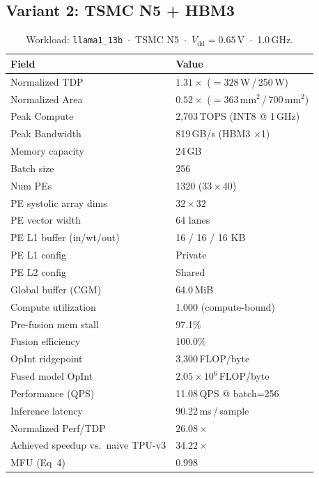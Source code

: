 \subsection{Variant 2: TSMC N5 + HBM3}
\label{app:n5}
\begin{table}[h]
\centering
\caption{Workload: \texttt{llama1\_13b}~$\cdot$~TSMC N5~$\cdot$~$V_\text{dd}=0.65$\,V~$\cdot$~1.0\,GHz.}
\label{tab:cheetah_v2_llama1_13b}
\small\setlength{\tabcolsep}{6pt}
\begin{tabular}{@{}ll@{}}
\toprule
\textbf{Field} & \textbf{Value} \\
\midrule
Normalized TDP          & $1.31\times$ ($= 328$\,W\,/\,250\,W) \\
Normalized Area         & $0.52\times$ ($= 363$\,mm$^2$\,/\,700\,mm$^2$) \\
Peak Compute            & 2{,}703\,TOPS (INT8 @ 1\,GHz) \\
Peak Bandwidth          & 819\,GB/s (HBM3 $\times$1) \\
Memory capacity         & 24\,GB \\
Batch size              & 256 \\
Num PEs                 & 1320 ($33 \times 40$) \\
PE systolic array dims  & $32 \times 32$ \\
PE vector width         & 64 lanes \\
PE L1 buffer (in/wt/out) & 16 / 16 / 16 KB \\
PE L1 config            & Private \\
PE L2 config            & Shared \\
Global buffer (CGM)     & 64.0\,MiB \\
\midrule
Compute utilization     & 1.000 (compute-bound) \\
Pre-fusion mem stall    & 97.1\% \\
Fusion efficiency       & 100.0\% \\
OpInt ridgepoint        & 3{,}300\,FLOP/byte \\
Fused model OpInt       & $2.05 \times 10^{6}$\,FLOP/byte \\
Performance (QPS)       & 11.08\,QPS @ batch=256 \\
Inference latency       & 90.22\,ms\,/\,sample \\
Normalized Perf/TDP     & $26.08\times$ \\
Achieved speedup vs.\ naive TPU-v3 & $34.22\times$ \\
MFU (Eq~4)              & 0.998 \\

\end{tabular}
\end{table}
